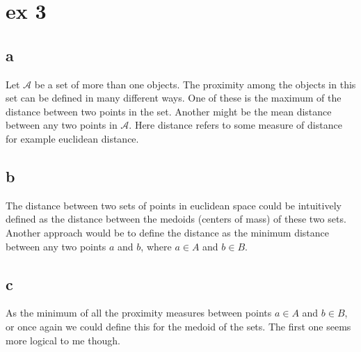 \documentclass{article}
\begin{document}
\section{ex 3}
\subsection{a}
Let $\mathcal{A}$ be a set of more than one objects. The proximity among the objects in this set can be defined in many different ways. One of these is the maximum of the distance between two points in the set. Another might be the mean distance between any two points in $\mathcal{A}$. Here distance refers to some measure of distance for example euclidean distance. 

\subsection{b}
The distance between two sets of points in euclidean space could be intuitively defined as the distance between the medoids (centers of mass) of these two sets. Another approach would be to define the distance as the minimum distance between any two points $a$ and $b$, where $a\in A$ and $b\in B$.

\subsection{c}
As the minimum of all the proximity measures between points $a\in A$ and $b\in B$, or once again we could define this for the medoid of the sets. The first one seems more logical to me though.
\end{document}
